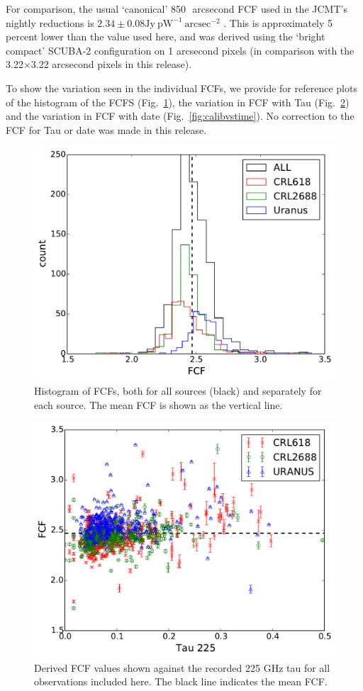 \documentclass[usenatbib]{mnras}
\begin{document}
For comparison, the usual `canonical' 850\,\micron\ arcsecond FCF used
in the JCMT's nightly reductions is
$2.34 \pm 0.08 \mathrm{Jy}\ \mathrm{pW}^{-1}\ \mathrm{arcsec}^{-2}$
\citep{Dempsey2013}. This is approximately 5 percent lower than the
value used here, and was derived using the `bright compact' SCUBA-2
configuration on 1 arcsecond pixels (in comparison with the
3.22$\times$3.22 arcsecond pixels in this release).

To show the variation seen in the individual FCFs, we provide for
reference plots of the histogram of the FCFS
(Fig.~\ref{fig:calibhist}), the variation in FCF with Tau
(Fig.~\ref{fig:calibvstau}) and the variation in FCF with date
(Fig.~\ref{fig:calibvstime}). No correction to the FCF for Tau or date
was made in this release.

\begin{figure}
  \centering
  \includegraphics[width=0.7\linewidth]{Legacy_calibration_histogram}
  \caption{Histogram of FCFs, both for all sources (black) and
    separately for each source. The mean FCF is shown as the vertical line. }
  \label{fig:calibhist}
\end{figure}

\begin{figure}
  \centering
  \includegraphics[width=0.7\linewidth]{Legacy_calibration_vstau}
  \caption{Derived FCF values shown against the recorded 225 GHz tau
    for all observations included here. The black line indicates the
    mean FCF.}
  \label{fig:calibvstau}
\end{figure}
\end{document}
